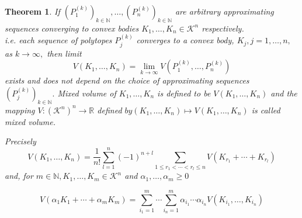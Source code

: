 \documentclass[oneside]{book}
\newtheorem{theorem}{Theorem}[section]
\begin{document}
	\begin{theorem}
		\label{t:10}
		If $\left(P_{1}^{(k)}\right)_{k \in \mathbb{N}}, \ldots,\left(P_{n}^{(k)}\right)_{k \in \mathbb{N}}$ are arbitrary approximating
		\\ 
		
		sequences converging to convex bodies  $K_{1}, \ldots, K_{n} \in \mathcal{K}^{n}$ respectively.
		\\
		i.e. each sequence of polytopes $P_{j}^{(k)}$ converges to a convex body, 
		$K_{j}, j=1, \ldots, n,$ as $k \rightarrow \infty,$ 
		then limit 
		\begin{equation}
			\label{eq51}
			V\left(K_{1}, \ldots, K_{n}\right)=\lim _{k \rightarrow \infty} V\left(P_{1}^{(k)}, \ldots, P_{n}^{(k)}\right)
		\end{equation}
		exists and does not depend on the choice of approximating sequences $\left(P_{j}^{(k)}\right)_{k \in \mathbb{N}}. $ \newline
		Mixed volume of $K_{1}, \ldots, K_{n} $ is defined to be $V\left(K_{1}, \ldots, K_{n}\right)$ \newline
		and the mapping $V:\left(\mathcal{K}^{n}\right)^{n} \rightarrow \mathbb{R}$ defined $b y\left(K_{1}, \ldots, K_{n}\right) \mapsto V\left(K_{1}, \ldots, K_{n}\right)$ is called mixed volume.\newline
		
		Precisely 
		\begin{equation} 
			\label{eq52}
			V\left(K_{1}, \ldots, K_{n}\right)=\frac{1}{n !} \sum_{l=1}^{n}(-1)^{n+l} \sum_{1 \leq r_{1}<\cdots<r_{l} \leq n} V\left(K_{r_{1}}+\cdots+K_{r_{l}}\right)
		\end{equation}
		and, for $m \in \mathbb{N}, K_{1}, \ldots, K_{m} \in \mathcal{K}^{n}$ and $\alpha_{1}, \ldots, \alpha_{m} \geq 0$
		
		
		\begin{equation}
			\label{eq53}
			V\left(\alpha_{1} K_{1}+\cdots+\alpha_{m} K_{m}\right)=\sum_{i_{1}=1}^{m} \cdots \sum_{i_{n}=1}^{m} \alpha_{i_{1}} \cdots \alpha_{i_{n}} V\left(K_{i_{1}}, \ldots, K_{i_{n}}\right)
		\end{equation}
	\end{theorem}
	
\end{document}
